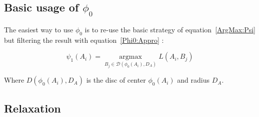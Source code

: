 \subsection{Basic usage of $\phi_0$}

The easiest way to use $\phi_0$ is to re-use the basic strategy of 
equation~\ref{ArgMax:Psi} but filtering the result with  equation~\ref{Phi0:Appro}  :


\begin{equation}
   \psi_1(A_i) =  \underset{B_j \in \mathcal D(\phi_0(A_i),D_A)}{\operatorname{argmax}}  L(A_i,B_j) 
\end{equation}

Where  $D(\phi_0(A_i),D_A)$ is  the disc of center $\phi_0(A_i)$ and radius $D_A$.

\label{Basic:ArgMax}

\subsection{Relaxation}





